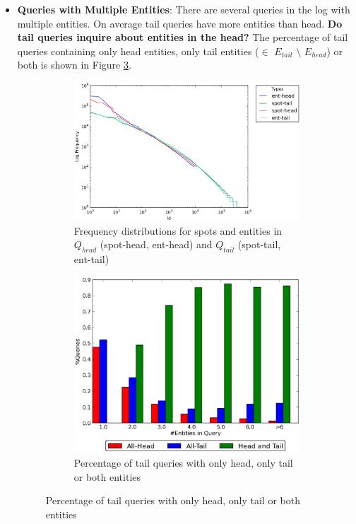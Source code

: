 \documentclass[a0,portrait,final]{a0poster}
\newcommand{\tail}[1]{$Q_{tail}${}}
\newcommand{\head}[1]{$Q_{head}${}}
\newcommand{\etail}[1]{$E_{tail}${}}
\newcommand{\ehead}[1]{$E_{head}${}}
\begin{document}
\begin{multicols}{2}
\begin {itemize}
	\item {\textbf{Queries with Multiple Entities}:} There are several queries in the log with multiple entities. 
	On average tail queries have more entities than head. \textbf{Do tail queries inquire about entities in the head?} The percentage of 		tail queries containing only head entities, only tail entities ($\in$ \etail{} $\setminus$ \ehead{}) or both is shown in 		Figure \ref{img:headTailEntPercent}.
	\vspace{10mm}
	\begin{figure}	
	\centering
	\begin{subfigure}
		\centering
		\includegraphics[width=0.6\columnwidth]{img/head-tail-ent-spot-dist.eps}
		\caption{Frequency distributions for spots and entities in \head{} (spot-head, ent-head) and \tail{} (spot-tail, ent-tail)}
		\label{img:distributions}
	\end{subfigure}
	\begin{subfigure}
		\centering
		\includegraphics[width=0.5\columnwidth]{img/entity-head-tail-count.eps}
		\caption{Percentage of tail queries with only head, only tail or both entities}
		\label{img:headTailEntPercent}
	\end{subfigure}
	\end{figure}
\end {itemize}



\end{multicols}
\end{document}
